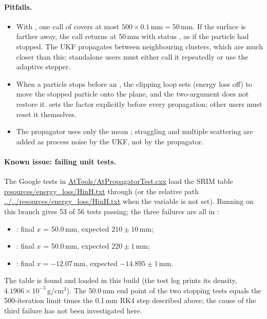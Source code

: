 \paragraph{Pitfalls.}
\begin{itemize}
\item With , one call of  covers at most
  $500 \times 0.1\,\mathrm{mm} = 50$\,mm. If the surface is farther away, the call returns at 50\,mm with status
  , as if the particle had stopped. The UKF propagates between neighbouring clusters, which are much
  closer than this; standalone users must either call it repeatedly or use the adaptive stepper.
\item When a particle stops before an , the clipping loop sets 
  (energy loss off) to move the stopped particle onto the plane, and the two-argument
   does not restore it.  sets the factor explicitly before
  every propagation; other users must reset it themselves.
\item The propagator uses only the mean \dedx{}; straggling and multiple scattering are added as process noise by
  the UKF, not by the propagator.
\end{itemize}

\paragraph{Known issue: failing unit tests.}
The Google tests in \url{AtTools/AtPropagatorTest.cxx} load the SRIM table
\url{resources/energy_loss/HinH.txt} through  (or the relative path
\url{../../resources/energy_loss/HinH.txt} when the variable is not set). Running  on
this branch gives 53 of 56 tests passing; the three failures are all in :
\begin{itemize}
\item {}: final $x$ = 50.0\,mm, expected $210\pm10$\,mm;
\item {}: final $x$ = 50.0\,mm, expected $220\pm1$\,mm;
\item {}: final $x = -12.07$\,mm, expected $-14.895\pm1$\,mm.
\end{itemize}
The table is found and loaded in this build (the test log prints its density, $4.1906\times10^{-5}$\,g/cm$^3$). The
50.0\,mm end point of the two stopping tests equals the 500-iteration limit times the 0.1\,mm RK4 step described above;
the cause of the third failure has not been investigated here.

